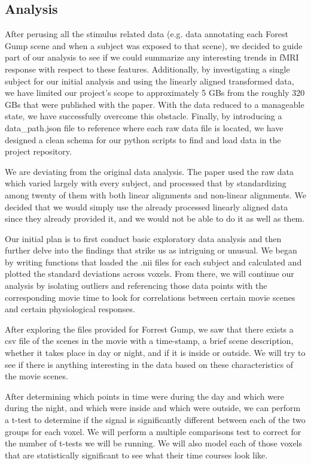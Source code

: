 \documentclass[11pt]{article}
\begin{document}
\subsection{Analysis}

After perusing all the stimulus related data (e.g. data
annotating each Forest Gump scene and when a subject was exposed to that
scene), we decided to guide part of our analysis to see if we could summarize
any interesting trends in fMRI response with respect to these features.
Additionally, by investigating a single subject for our initial analysis and
using the linearly aligned transformed data, we have limited our project’s
scope to approximately 5 GBs from the roughly 320 GBs that were published with
the paper. With the data reduced to a manageable state, we have successfully
overcome this obstacle. Finally, by introducing a data\_path.json file to
reference where each raw data file is located, we have designed a clean schema
for our python scripts to find and load data in the project repository.

We are deviating from the original data analysis. The paper used the raw data
which varied largely with every subject, and processed that by standardizing
among twenty of them with both linear alignments and non-linear alignments. We
decided that we would simply use the already processed linearly aligned data
since they already provided it, and we would not be able to do it as well as
them.

Our initial plan is to first conduct basic exploratory data analysis
and then further delve into the findings that strike us as intriguing or
unusual. We began by writing functions that loaded the .nii files for each
subject and calculated and plotted the standard deviations across voxels. From
there, we will continue our analysis by isolating outliers and referencing
those data points with the corresponding movie time to look for correlations
between certain movie scenes and certain physiological responses.

After exploring the files provided for Forrest Gump, we saw that there exists
a csv file of the scenes in the movie with a time-stamp, a brief scene
description, whether it takes place in day or night, and if it is inside or
outside. We will try to see if there is anything interesting in the data based
on these characteristics of the movie scenes.

After determining which points in time were during the day and which were
during the night, and which were inside and which were outside, we can perform
a t-test to determine if the signal is significantly different between each of
the two groups for each voxel.  We will perform a multiple comparisons test to
correct for the number of t-tests we will be running. We will also model
each of those voxels that are statistically significant to see what their time
courses look like.
\end{document}
